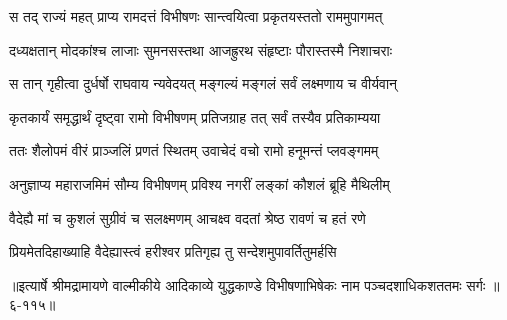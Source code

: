 \twolineshloka
{स तद् राज्यं महत् प्राप्य रामदत्तं विभीषणः}
{सान्त्वयित्वा प्रकृतयस्ततो राममुपागमत्} %

\twolineshloka
{दध्यक्षतान् मोदकांश्च लाजाः सुमनसस्तथा}
{आजह्रुरथ संहृष्टाः पौरास्तस्मै निशाचराः} %

\twolineshloka
{स तान् गृहीत्वा दुर्धर्षो राघवाय न्यवेदयत्}
{मङ्गल्यं मङ्गलं सर्वं लक्ष्मणाय च वीर्यवान्} %

\twolineshloka
{कृतकार्यं समृद्धार्थं दृष्ट्वा रामो विभीषणम्}
{प्रतिजग्राह तत् सर्वं तस्यैव प्रतिकाम्यया} %

\twolineshloka
{ततः शैलोपमं वीरं प्राञ्जलिं प्रणतं स्थितम्}
{उवाचेदं वचो रामो हनूमन्तं प्लवङ्गमम्} %

\twolineshloka
{अनुज्ञाप्य महाराजमिमं सौम्य विभीषणम्}
{प्रविश्य नगरीं लङ्कां कौशलं ब्रूहि मैथिलीम्} %

\twolineshloka
{वैदेह्यै मां च कुशलं सुग्रीवं च सलक्ष्मणम्}
{आचक्ष्व वदतां श्रेष्ठ रावणं च हतं रणे} %

\twolineshloka
{प्रियमेतदिहाख्याहि वैदेह्यास्त्वं हरीश्वर}
{प्रतिगृह्य तु सन्देशमुपावर्तितुमर्हसि} %


॥इत्यार्षे श्रीमद्रामायणे वाल्मीकीये आदिकाव्ये युद्धकाण्डे विभीषणाभिषेकः नाम पञ्चदशाधिकशततमः सर्गः ॥६-११५॥
